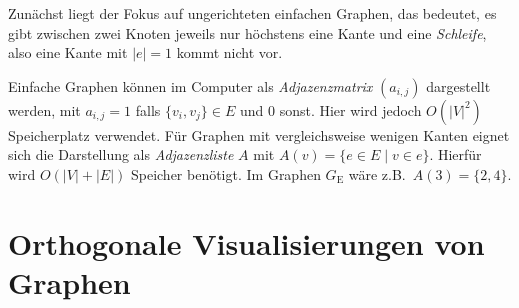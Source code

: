 \documentclass[a4paper]{scrreprt}
\theoremstyle{definition}
\begin{document}
Zunächst liegt der Fokus auf ungerichteten einfachen Graphen, das bedeutet, es gibt zwischen zwei Knoten jeweils nur höchstens eine Kante und eine \emph{Schleife}, also eine Kante mit $|e| = 1$ kommt nicht vor.

Einfache Graphen können im Computer als \emph{Adjazenzmatrix} $(a_{i,j})$ dargestellt werden, mit $a_{i,j} = 1$ falls $\{v_i, v_j\} \in E$ und $0$ sonst. Hier wird jedoch $O(|V|^2)$ Speicherplatz verwendet. Für Graphen mit vergleichsweise wenigen Kanten eignet sich die Darstellung als \emph{Adjazenzliste} $A$ mit $A(v) = \{e \in E \mid v \in e\}$. Hierfür wird $O(|V| + |E|)$ Speicher benötigt. Im Graphen $G_\text{E}$ wäre z.B.\ $A(3) = \{2,4\}$. %

\section{Orthogonale Visualisierungen von Graphen}
\label{sec:orthogonalDrawings}
\end{document}
